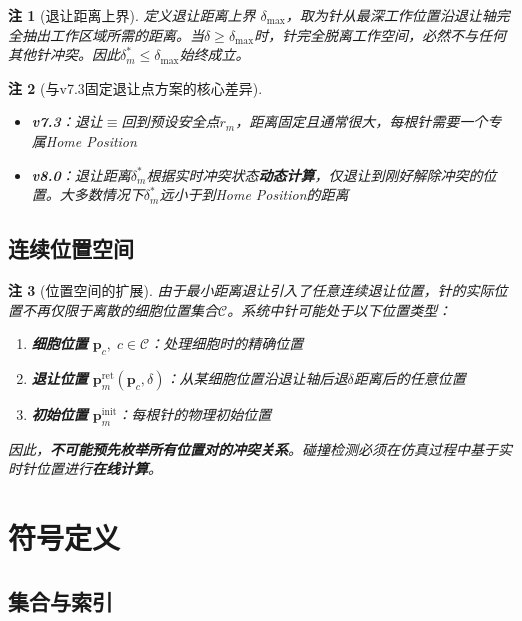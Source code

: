 \documentclass[11pt,a4paper]{article}
\newtheorem{remark}{注}[section]
\begin{document}
\begin{remark}[退让距离上界]
定义退让距离上界 $\delta_{\max}$，取为针从最深工作位置沿退让轴完全抽出工作区域所需的距离。当$\delta \geq \delta_{\max}$时，针完全脱离工作空间，必然不与任何其他针冲突。因此$\delta_m^* \leq \delta_{\max}$始终成立。
\end{remark}

\begin{remark}[与v7.3固定退让点方案的核心差异]
\begin{itemize}
    \item \textbf{v7.3}：退让$\equiv$回到预设安全点$r_m$，距离固定且通常很大，每根针需要一个专属Home Position
    \item \textbf{v8.0}：退让距离$\delta_m^*$根据实时冲突状态\textbf{动态计算}，仅退让到刚好解除冲突的位置。大多数情况下$\delta_m^*$远小于到Home Position的距离
\end{itemize}
\end{remark}

\subsection{连续位置空间}

\begin{remark}[位置空间的扩展]
由于最小距离退让引入了任意连续退让位置，针的实际位置不再仅限于离散的细胞位置集合$\mathcal{C}$。系统中针可能处于以下位置类型：
\begin{enumerate}
    \item \textbf{细胞位置} $\mathbf{p}_c, \; c \in \mathcal{C}$：处理细胞时的精确位置
    \item \textbf{退让位置} $\mathbf{p}_m^{\text{ret}}(\mathbf{p}_c, \delta)$：从某细胞位置沿退让轴后退$\delta$距离后的任意位置
    \item \textbf{初始位置} $\mathbf{p}_m^{\text{init}}$：每根针的物理初始位置
\end{enumerate}
因此，\textbf{不可能预先枚举所有位置对的冲突关系}。碰撞检测必须在仿真过程中基于实时针位置进行\textbf{在线计算}。
\end{remark}

\section{符号定义}

\subsection{集合与索引}
\end{document}
